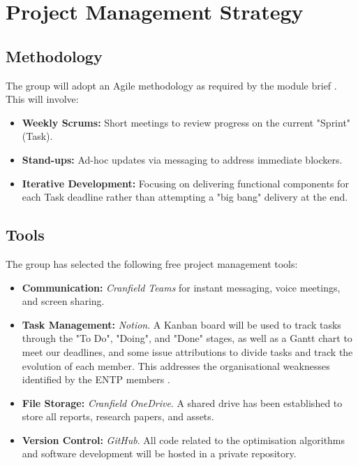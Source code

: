 \section{Project Management Strategy}

\subsection{Methodology}
The group will adopt an Agile methodology as required by the module brief \cite{phillips2025brief}. This will involve:
\begin{itemize}
    \item \textbf{Weekly Scrums:} Short meetings to review progress on the current "Sprint" (Task).
    \item \textbf{Stand-ups:} Ad-hoc updates via messaging to address immediate blockers.
    \item \textbf{Iterative Development:} Focusing on delivering functional components for each Task deadline rather than attempting a "big bang" delivery at the end.
\end{itemize}

\subsection{Tools}
The group has selected the following free project management tools:

\begin{itemize}
    \item \textbf{Communication:} \textit{Cranfield Teams} for instant messaging, voice meetings, and screen sharing.
    \item \textbf{Task Management:} \textit{Notion}. A Kanban board will be used to track tasks through the "To Do", "Doing", and "Done" stages, as well as a Gantt chart to meet our deadlines, and some issue attributions to divide tasks and track the evolution of each member. This addresses the organisational weaknesses identified by the ENTP members \cite{harambatTask1}.
    \item \textbf{File Storage:} \textit{Cranfield OneDrive}. A shared drive has been established to store all reports, research papers, and assets.
    \item \textbf{Version Control:} \textit{GitHub}. All code related to the optimisation algorithms and software development will be hosted in a private repository.
\end{itemize}